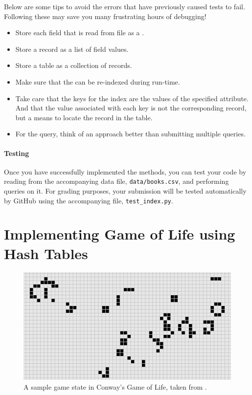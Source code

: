 \documentclass[addpoints]{exam}
\begin{document}
  Below are some tips to avoid the errors that have previously caused tests to fail. Following these may save you many frustrating hours of debugging!
  \begin{itemize}
  \item Store each field that is read from file as a .
  \item Store a record as a list of field values.
  \item Store a table as a collection of records.
  \item Make sure that the  can be re-indexed during run-time.
  \item Take care that the keys for the index are the values of the specified attribute. And that the value associated with each key is not the corresponding record, but a means to locate the record in the table.
  \item For the  query, think of an approach better than submitting multiple  queries.
  \end{itemize}

  \subsection{Testing}

  Once you have successfully implemented the methods, you can test your code by reading from the accompanying data file, \texttt{data/books.csv}, and performing queries on it. For grading purposes, your submission will be tested automatically by GitHub using the accompanying  file, \texttt{test\_index.py}.

\newpage
\part{Implementing Game of Life using Hash Tables}
  
\begin{figure}[!h]
  \centering
  \includegraphics[scale=.8]{banner}
  \caption{A sample game state in Conway's Game of Life, taken from \cite{chaos}.} %
\end{figure}
\end{document}
